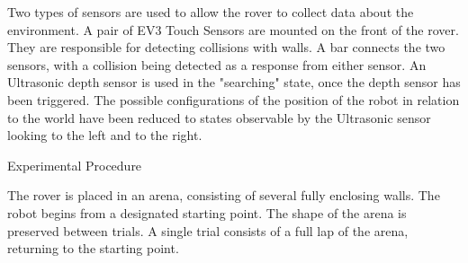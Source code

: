 \documentclass[a4paper,12pt,twocolumn]{article}
\begin{document}
Two types of sensors are used to allow the rover to collect data about the environment. A pair of EV3 Touch Sensors are mounted on the front of the rover. They are responsible for detecting collisions with walls. A bar connects the two sensors, with a collision being detected as a response from either sensor. An Ultrasonic depth sensor is used in the "searching" state, once the depth sensor has been triggered. The possible configurations of the position of the robot in relation to the world have been reduced to states observable by the Ultrasonic sensor looking to the left and to the right. 

Experimental Procedure

The rover is placed in an arena, consisting of several fully enclosing walls. The robot begins from a designated starting point. The shape of the arena is preserved between trials.
A single trial consists of a full lap of the arena, returning to the starting point. 

\end{document}
